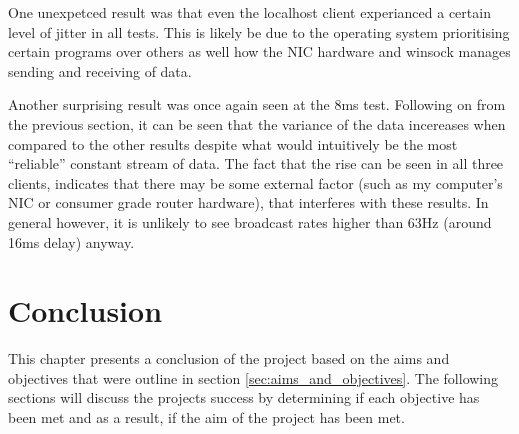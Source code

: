 One unexpetced result was that even the localhost client experianced a certain level of jitter in all tests. This is likely be due to the operating system prioritising certain programs over others as well how the NIC hardware and winsock manages sending and receiving of data.

Another surprising result was once again seen at the 8ms test. Following on from the previous section, it can be seen that the variance of the data incereases when compared to the other results despite what would intuitively be the most ``reliable'' constant stream of data. The fact that the rise can be seen in all three clients, indicates that there may be some external factor (such as my computer's NIC or consumer grade router hardware), that interferes with these results. In general however, it is unlikely to see broadcast rates higher than 63Hz (around 16ms delay) anyway.



\chapter{Conclusion}
This chapter presents a conclusion of the project based on the aims and objectives that were outline in section \ref{sec:aims_and_objectives}. The following sections will discuss the projects success by determining if each objective has been met and as a result, if the aim of the project has been met.

